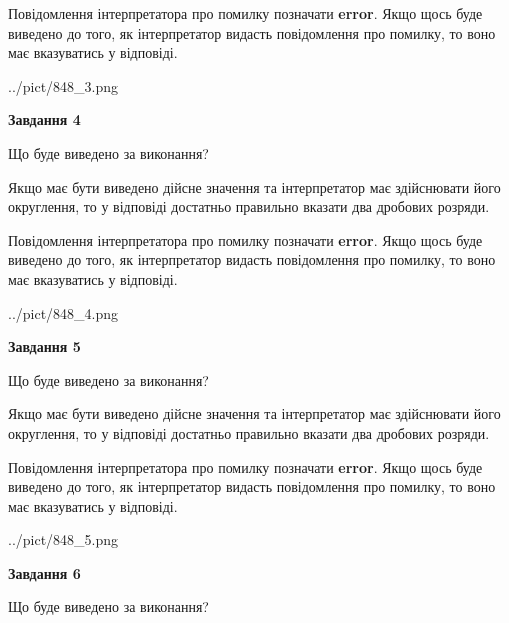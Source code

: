 \documentclass[12pt, ukrainian]{article}
\begin{document}
{\begin {Large}
Повідомлення інтерпретатора про помилку позначати \textbf{error}.
Якщо щось буде виведено до того, як інтерпретатор видасть повідомлення про помилку, 
то воно має вказуватись у відповіді. \par

\begin{center}
	{../pict/848_3.png}
\end{center}
\newpage

{\begin {center}\textbf{Завдання 4}\end {center}}\par
Що буде виведено за виконання? \par

Якщо має бути виведено дійсне значення та інтерпретатор має здійснювати його округлення, 
то у відповіді достатньо правильно вказати два дробових розряди.

Повідомлення інтерпретатора про помилку позначати \textbf{error}.
Якщо щось буде виведено до того, як інтерпретатор видасть повідомлення про помилку, 
то воно має вказуватись у відповіді. \par

\begin{center}
	{../pict/848_4.png}
\end{center}
\newpage

{\begin {center}\textbf{Завдання 5}\end {center}}\par
Що буде виведено за виконання? \par

Якщо має бути виведено дійсне значення та інтерпретатор має здійснювати його округлення, 
то у відповіді достатньо правильно вказати два дробових розряди.

Повідомлення інтерпретатора про помилку позначати \textbf{error}.
Якщо щось буде виведено до того, як інтерпретатор видасть повідомлення про помилку, 
то воно має вказуватись у відповіді. \par

\begin{center}
	{../pict/848_5.png}
\end{center}
\newpage

{\begin {center}\textbf{Завдання 6}\end {center}}\par
Що буде виведено за виконання? \par


\end{Large}}
\end{document}

